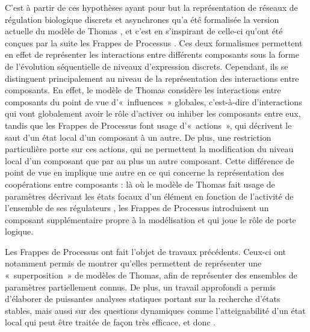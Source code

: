 C'est à partir de ces hypothèses
ayant pour but la représentation de réseaux de régulation biologique discrets et asynchrones
qu'a été formalisée
la version actuelle du modèle de Thomas \cite{Richard06},
et c'est en s'inspirant de celle-ci qu'ont été conçues par la suite
les Frappes de Processus \cite{PMR10-TCSB}.
Ces deux formalismes permettent en effet
de représenter les interactions entre différents composants
sous la forme de l'évolution séquentielle de niveaux d'expression discrets.
Cependant, ils se distinguent principalement au niveau de la représentation
des interactions entre composants.
En effet, le modèle de Thomas considère les interactions entre composants du point
de vue d'«~influences~» globales, c'est-à-dire d'interactions qui vont globalement avoir
le rôle d'activer ou inhiber les composants entre eux,
tandis que les Frappes de Processus font usage d'«~actions~»,
qui décrivent le saut d'un état local d'un composant à un autre.
De plus, une restriction particulière porte sur ces actions,
qui ne permettent la modification du niveau local d'un composant
que par au plus un autre composant.
Cette différence de point de vue en implique une autre en ce qui concerne la représentation
des coopérations entre composants :
là où le modèle de Thomas fait usage de paramètres décrivant
les états focaux d'un élément en fonction de l'activité de l'ensemble de ses régulateurs
\cite{Snoussi89},
les Frappes de Processus introduisent un composant supplémentaire propre à la modélisation
et qui joue le rôle de porte logique.

Les Frappes de Processus ont fait l'objet de travaux précédents.
Ceux-ci ont notamment permis de montrer qu'elles permettent de représenter une «~superposition~»
de modèles de Thomas, afin de représenter des ensembles de paramètres partiellement connus.
De plus, un travail approfondi a permis d'élaborer de puissantes analyses statiques
portant sur la recherche d'états stables,
mais aussi sur des questions dynamiques comme l'atteignabilité d'un état local \cite{PMR12-MSCS}
qui peut être traitée de façon très efficace, et donc .





